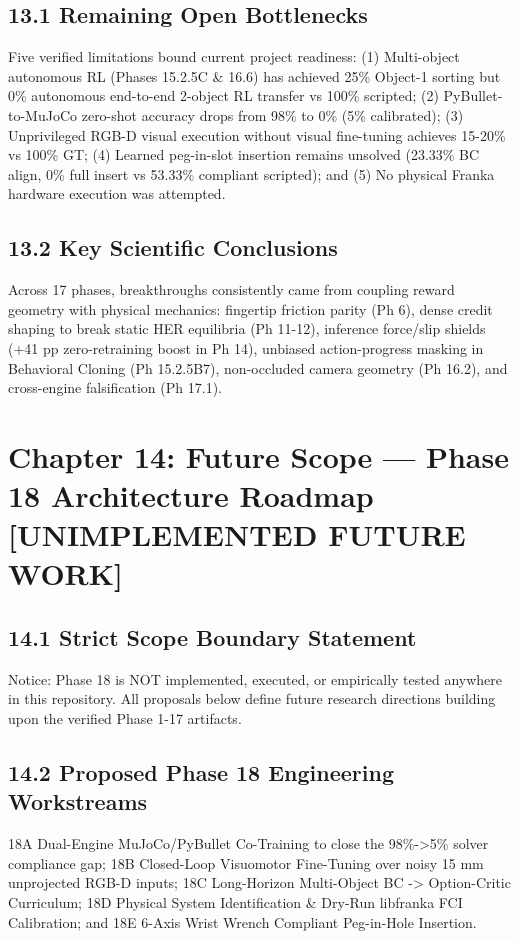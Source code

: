 \documentclass[11pt,a4paper,oneside]{book}
\begin{document}
\section{13.1 Remaining Open Bottlenecks}
Five verified limitations bound current project readiness: (1) Multi-object autonomous RL (Phases 15.2.5C \& 16.6) has achieved 25\% Object-1 sorting but 0\% autonomous end-to-end 2-object RL transfer vs 100\% scripted; (2) PyBullet-to-MuJoCo zero-shot accuracy drops from 98\% to 0\% (5\% calibrated); (3) Unprivileged RGB-D visual execution without visual fine-tuning achieves 15-20\% vs 100\% GT; (4) Learned peg-in-slot insertion remains unsolved (23.33\% BC align, 0\% full insert vs 53.33\% compliant scripted); and (5) No physical Franka hardware execution was attempted.

\section{13.2 Key Scientific Conclusions}
Across 17 phases, breakthroughs consistently came from coupling reward geometry with physical mechanics: fingertip friction parity (Ph 6), dense credit shaping to break static HER equilibria (Ph 11-12), inference force/slip shields (+41 pp zero-retraining boost in Ph 14), unbiased action-progress masking in Behavioral Cloning (Ph 15.2.5B7), non-occluded camera geometry (Ph 16.2), and cross-engine falsification (Ph 17.1).

\chapter{Chapter 14: Future Scope — Phase 18 Architecture Roadmap [UNIMPLEMENTED FUTURE WORK]}
\section{14.1 Strict Scope Boundary Statement}
Notice: Phase 18 is NOT implemented, executed, or empirically tested anywhere in this repository. All proposals below define future research directions building upon the verified Phase 1-17 artifacts.

\section{14.2 Proposed Phase 18 Engineering Workstreams}
18A Dual-Engine MuJoCo/PyBullet Co-Training to close the 98\%->5\% solver compliance gap; 18B Closed-Loop Visuomotor Fine-Tuning over noisy 15 mm unprojected RGB-D inputs; 18C Long-Horizon Multi-Object BC -> Option-Critic Curriculum; 18D Physical System Identification \& Dry-Run libfranka FCI Calibration; and 18E 6-Axis Wrist Wrench Compliant Peg-in-Hole Insertion.
\end{document}
